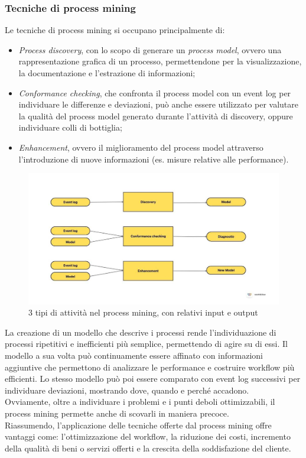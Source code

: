 \subsubsection{Tecniche di process mining}
Le tecniche di process mining si occupano principalmente di:
\begin{itemize}
\item \textit{Process discovery}, con lo scopo di generare un \textit{process model}, ovvero una rappresentazione grafica di un processo, permettendone per la visualizzazione, la documentazione e l'estrazione di informazioni;

\item \textit{Conformance checking}, che confronta il process model con un event log per individuare le differenze e deviazioni, può anche essere utilizzato per valutare la qualità del process model generato durante l'attività di discovery, oppure individuare colli di bottiglia;

\item \textit{Enhancement}, ovvero il miglioramento del process model attraverso l'introduzione di nuove informazioni (es. misure relative alle performance).
\end{itemize}

\begin{figure}[H] 
    \centering 
    \includegraphics[width=0.9\columnwidth]{immagini/process_mining_techniques.jpg} 
    \caption{3 tipi di attività nel process mining, con relativi input e output \cite{site:process-mining-techniques-img}}
\end{figure}

La creazione di un modello che descrive i processi rende l'individuazione di processi ripetitivi e inefficienti più semplice, permettendo di agire su di essi. Il modello a sua volta può continuamente essere affinato con informazioni aggiuntive che permettono di analizzare le performance e costruire workflow più efficienti. Lo stesso modello può poi essere comparato con event log successivi per individuare deviazioni, mostrando dove, quando e perché accadono. 
\\
Ovviamente, oltre a individuare i problemi e i punti deboli ottimizzabili, il process mining permette anche di scovarli in maniera precoce.
\\
Riassumendo, l'applicazione delle tecniche offerte dal process mining offre vantaggi come: l'ottimizzazione del workflow, la riduzione dei costi, incremento della qualità di beni o servizi offerti e la crescita della soddisfazione del cliente.


